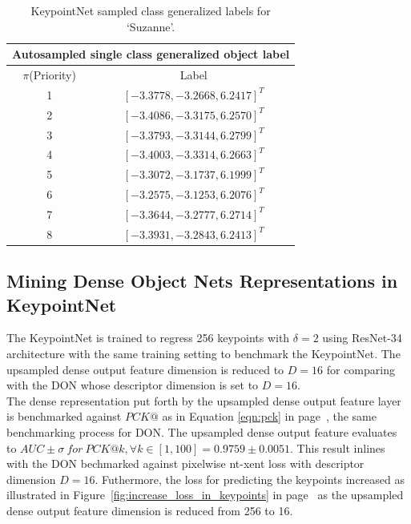 \begin{table}[htb]
    \centering
    \begin{tabular}{ll}
        \hline
        \multicolumn{2}{c}{Autosampled single class generalized object label}                     \\ \hline
        \multicolumn{1}{c}{$\pi$(Priority)} & \multicolumn{1}{c}{Label}                           \\ \hline
        \multicolumn{1}{c}{1}               & \multicolumn{1}{c}{$[-3.3778, -3.2668,  6.2417]^T$} \\
        \multicolumn{1}{c}{2}               & \multicolumn{1}{c}{$[-3.4086, -3.3175,  6.2570]^T$} \\
        \multicolumn{1}{c}{3}               & \multicolumn{1}{c}{$[-3.3793, -3.3144,  6.2799]^T$} \\
        \multicolumn{1}{c}{4}               & \multicolumn{1}{c}{$[-3.4003, -3.3314,  6.2663]^T$} \\
        \multicolumn{1}{c}{5}               & \multicolumn{1}{c}{$[-3.3072, -3.1737,  6.1999]^T$} \\
        \multicolumn{1}{c}{6}               & \multicolumn{1}{c}{$[-3.2575, -3.1253,  6.2076]^T$} \\
        \multicolumn{1}{c}{7}               & \multicolumn{1}{c}{$[-3.3644, -3.2777,  6.2714]^T$} \\
        \multicolumn{1}{c}{8}               & \multicolumn{1}{c}{$[-3.3931, -3.2843,  6.2413]^T$} \\ \hline
    \end{tabular}
    \caption{KeypointNet sampled class generalized labels for `Suzanne'.}
    \label{table:sampled object generalized labels}
\end{table}


\subsection{Mining Dense Object Nets Representations in KeypointNet}

The KeypointNet is trained to regress 256 keypoints with $\delta = 2$ using \ac{ResNet}-34 architecture
with the same training setting to benchmark the KeypointNet.
The upsampled dense output feature dimension is reduced to $D=16$ for comparing with the \ac{DON} whose descriptor
dimension is set to $D=16$.\\

The dense representation put forth by the upsampled dense output feature layer is benchmarked against
$PCK@$ as in Equation \ref{eqn:pck} in page~\pageref{eqn:pck}, the same benchmarking process for \ac{DON}.
The upsampled dense output feature evaluates to $AUC \pm \sigma \ for \ PCK@k, \forall k \in [1, 100] = 0.9759 \pm 0.0051$.
This result inlines with the \ac{DON} bechmarked against pixelwise nt-xent loss with descriptor dimension $D = 16$.
Futhermore, the loss for predicting the keypoints increased as illustrated in Figure~\ref{fig:increase_loss_in_keypoints} in page~\pageref{fig:increase_loss_in_keypoints}
as the upsampled dense output feature dimension is reduced from 256 to 16.\\

